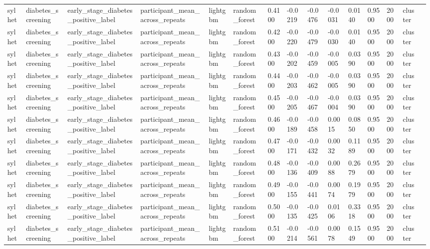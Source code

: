 \begin{tabular}{lllllllllllllll}
sylhet & diabetes\_screening & early\_stage\_diabetes\_positive\_label & participant\_mean\_across\_repeats & lightgbm & random\_forest & 0.4100 & -0.0219 & -0.0476 & -0.0031 & 0.0140 & 0.9500 & 2000 & cluster &  \\
sylhet & diabetes\_screening & early\_stage\_diabetes\_positive\_label & participant\_mean\_across\_repeats & lightgbm & random\_forest & 0.4200 & -0.0220 & -0.0479 & -0.0030 & 0.0140 & 0.9500 & 2000 & cluster &  \\
sylhet & diabetes\_screening & early\_stage\_diabetes\_positive\_label & participant\_mean\_across\_repeats & lightgbm & random\_forest & 0.4300 & -0.0202 & -0.0459 & -0.0005 & 0.0390 & 0.9500 & 2000 & cluster &  \\
sylhet & diabetes\_screening & early\_stage\_diabetes\_positive\_label & participant\_mean\_across\_repeats & lightgbm & random\_forest & 0.4400 & -0.0203 & -0.0462 & -0.0005 & 0.0390 & 0.9500 & 2000 & cluster &  \\
sylhet & diabetes\_screening & early\_stage\_diabetes\_positive\_label & participant\_mean\_across\_repeats & lightgbm & random\_forest & 0.4500 & -0.0205 & -0.0467 & -0.0004 & 0.0390 & 0.9500 & 2000 & cluster &  \\
sylhet & diabetes\_screening & early\_stage\_diabetes\_positive\_label & participant\_mean\_across\_repeats & lightgbm & random\_forest & 0.4600 & -0.0189 & -0.0458 & 0.0015 & 0.0850 & 0.9500 & 2000 & cluster &  \\
sylhet & diabetes\_screening & early\_stage\_diabetes\_positive\_label & participant\_mean\_across\_repeats & lightgbm & random\_forest & 0.4700 & -0.0171 & -0.0432 & 0.0032 & 0.1189 & 0.9500 & 2000 & cluster &  \\
sylhet & diabetes\_screening & early\_stage\_diabetes\_positive\_label & participant\_mean\_across\_repeats & lightgbm & random\_forest & 0.4800 & -0.0136 & -0.0409 & 0.0088 & 0.2679 & 0.9500 & 2000 & cluster &  \\
sylhet & diabetes\_screening & early\_stage\_diabetes\_positive\_label & participant\_mean\_across\_repeats & lightgbm & random\_forest & 0.4900 & -0.0155 & -0.0441 & 0.0074 & 0.1979 & 0.9500 & 2000 & cluster &  \\
sylhet & diabetes\_screening & early\_stage\_diabetes\_positive\_label & participant\_mean\_across\_repeats & lightgbm & random\_forest & 0.5000 & -0.0135 & -0.0425 & 0.0106 & 0.3318 & 0.9500 & 2000 & cluster &  \\
sylhet & diabetes\_screening & early\_stage\_diabetes\_positive\_label & participant\_mean\_across\_repeats & lightgbm & random\_forest & 0.5100 & -0.0214 & -0.0561 & 0.0078 & 0.1549 & 0.9500 & 2000 & cluster &  \\

\end{tabular}
